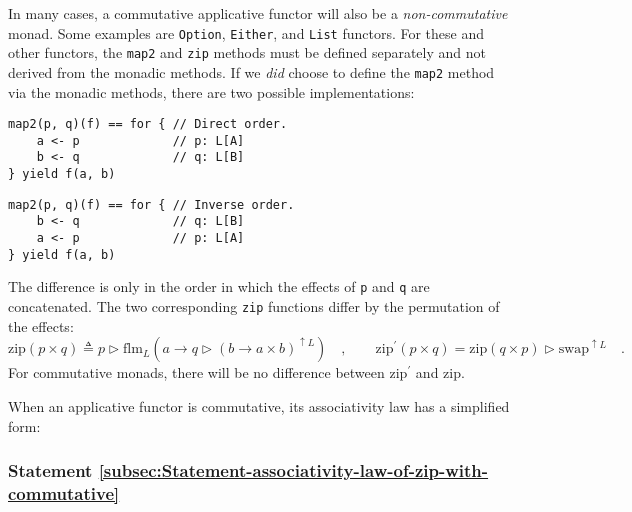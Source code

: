 In many cases, a commutative applicative functor will also be a \emph{non-commutative}
monad. Some examples are \lstinline!Option!, \lstinline!Either!,
and \lstinline!List! functors. For these and other functors, the
\lstinline!map2! and \lstinline!zip! methods must be defined separately
and not derived from the monadic methods. If we \emph{did} choose
to define the \lstinline!map2! method via the monadic methods, there
are two possible implementations:

\noindent %
\begin{minipage}[c][1\totalheight][t]{0.45\columnwidth}%
\begin{lstlisting}
map2(p, q)(f) == for { // Direct order.
    a <- p             // p: L[A]
    b <- q             // q: L[B]
} yield f(a, b)
\end{lstlisting}
%
\end{minipage}\hfill{}%
\begin{minipage}[c][1\totalheight][t]{0.45\columnwidth}%
\begin{lstlisting}
map2(p, q)(f) == for { // Inverse order.
    b <- q             // q: L[B]
    a <- p             // p: L[A]
} yield f(a, b)
\end{lstlisting}
%
\end{minipage}

\noindent The difference is only in the order in which the effects
of \lstinline!p! and \lstinline!q! are concatenated. The two corresponding
\lstinline!zip! functions differ by the permutation of the effects:
\[
\text{zip}\left(p\times q\right)\triangleq p\triangleright\text{flm}_{L}(a\rightarrow q\triangleright(b\rightarrow a\times b)^{\uparrow L})\quad,\quad\quad\text{zip}^{\prime}\left(p\times q\right)=\text{zip}\left(q\times p\right)\triangleright\text{swap}^{\uparrow L}\quad.
\]
For commutative monads, there will be no difference between $\text{zip}^{\prime}$
and $\text{zip}$. 

When an applicative functor is commutative, its associativity law
has a simplified form:

\subsubsection{Statement \label{subsec:Statement-associativity-law-of-zip-with-commutative}\ref{subsec:Statement-associativity-law-of-zip-with-commutative}}


